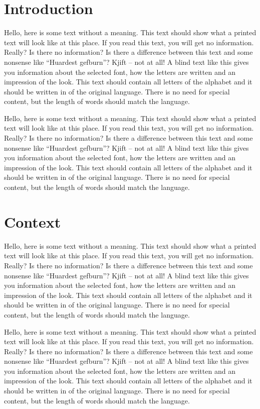 \section{Introduction}
\label{sec:introduction}

Hello, here is some text without a meaning. This text should show what a
printed text will look like at this place. If you read this text, you will get
no information. Really? Is there no information? Is there a difference between
this text and some nonsense like “Huardest gefburn”? Kjift – not at all! A
blind text like this gives you information about the selected font, how the
letters are written and an impression of the look. This text should contain all
letters of the alphabet and it should be written in of the original language.
There is no need for special content, but the length of words should match the
language.

Hello, here is some text without a meaning. This text should show what a
printed text will look like at this place. If you read this text, you will get
no information. Really? Is there no information? Is there a difference between
this text and some nonsense like “Huardest gefburn”? Kjift – not at all! A
blind text like this gives you information about the selected font, how the
letters are written and an impression of the look. This text should contain all
letters of the alphabet and it should be written in of the original language.
There is no need for special content, but the length of words should match the
language.

\section{Context}
\label{sec:context}

Hello, here is some text without a meaning. This text should show what a
printed text will look like at this place. If you read this text, you will get
no information. Really? Is there no information? Is there a difference between
this text and some nonsense like “Huardest gefburn”? Kjift – not at all! A
blind text like this gives you information about the selected font, how the
letters are written and an impression of the look. This text should contain all
letters of the alphabet and it should be written in of the original language.
There is no need for special content, but the length of words should match the
language.


Hello, here is some text without a meaning. This text should show what a
printed text will look like at this place. If you read this text, you will get
no information. Really? Is there no information? Is there a difference between
this text and some nonsense like “Huardest gefburn”? Kjift – not at all! A
blind text like this gives you information about the selected font, how the
letters are written and an impression of the look. This text should contain all
letters of the alphabet and it should be written in of the original language.
There is no need for special content, but the length of words should match the
language.

